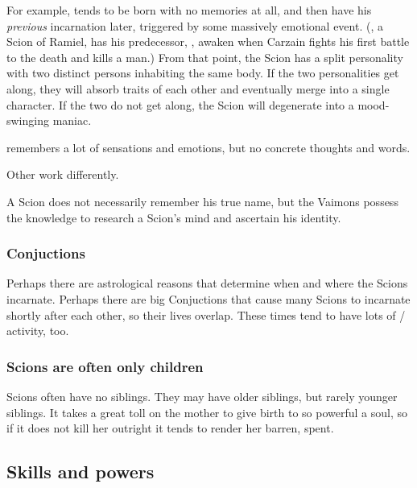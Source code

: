 For example,  tends to be born with no memories at all, and then have his \emph{previous} incarnation  later, triggered by some massively emotional event. (, a Scion of Ramiel, has his predecessor, , awaken when Carzain fights his first battle to the death and kills a man.) 
From that point, the Scion has a split personality with two distinct persons inhabiting the same body. If the two personalities get along, they will absorb traits of each other and eventually merge into a single character. If the two do not get along, the Scion will degenerate into a mood-swinging maniac.

\Shiaraid{} remembers a lot of sensations and emotions, but no concrete thoughts and words. 

Other \Malachim{} work differently. 

A Scion does not necessarily remember his true name, but the Vaimons possess the knowledge to research a Scion's mind and ascertain his \Malach{} identity. 





\subsubsection{Conjuctions}
Perhaps there are astrological reasons that determine when and where the Scions incarnate. 
Perhaps there are big Conjuctions that cause many Scions to incarnate shortly after each other, so their lives overlap. 
These times tend to have lots of \vertex/\matrix{} activity, too. 





\subsubsection{Scions are often only children}
Scions often have no siblings. 
They may have older siblings, but rarely younger siblings. 
It takes a great toll on the mother to give birth to so powerful a soul, so if it does not kill her outright it tends to render her barren, spent. 










\subsection{Skills and powers}





